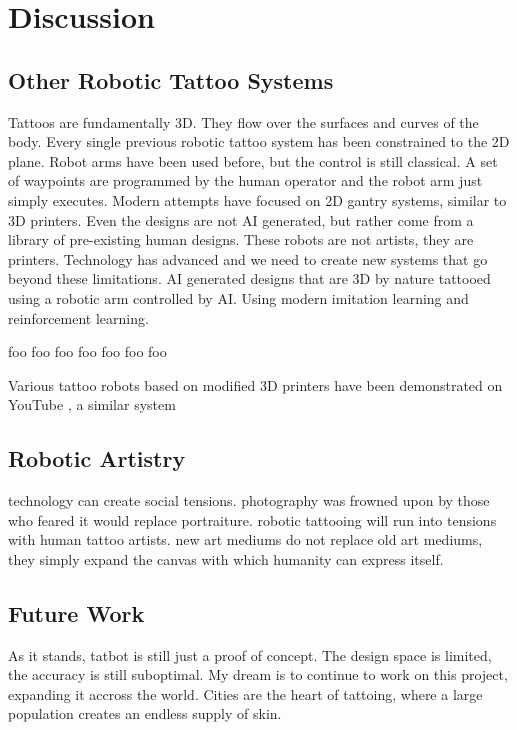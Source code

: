 \documentclass[11pt]{article}
\begin{document}
\section{Discussion}

\subsection{Other Robotic Tattoo Systems}

Tattoos are fundamentally 3D.
They flow over the surfaces and curves of the body.
Every single previous robotic tattoo system has been constrained to the 2D plane.
Robot arms have been used before, but the control is still classical.
A set of waypoints are programmed by the human operator and the robot arm just simply executes.
Modern attempts have focused on 2D gantry systems, similar to 3D printers.
Even the designs are not AI generated, but rather come from a library of pre-existing human designs.
These robots are not artists, they are printers.
Technology has advanced and we need to create new systems that go beyond these limitations.
AI generated designs that are 3D by nature tattooed using a robotic arm controlled by AI.
Using modern imitation learning and reinforcement learning.

foo \cite{NietoBastida2023}
foo \cite{arar2025swiftsketch}
foo \cite{carlier2020deepsvg}
foo \cite{mellor2020unsupervised}
foo \cite{ha2017neural}
foo \cite{huang2019learning}
foo \cite{kotani2019teaching}

Various tattoo robots based on modified 3D printers have been demonstrated on YouTube \cite{EmilyTheEngineer2025}, a similar system \cite{YamanDeif2021}

\subsection{Robotic Artistry}

technology can create social tensions.
photography was frowned upon by those who feared it would replace portraiture.
robotic tattooing will run into tensions with human tattoo artists.
new art mediums do not replace old art mediums, they simply expand the canvas with which humanity can express itself.

\subsection{Future Work}

As it stands, tatbot is still just a proof of concept.
The design space is limited, the accuracy is still suboptimal.
My dream is to continue to work on this project, expanding it accross the world.
Cities are the heart of tattoing, where a large population creates an endless supply of skin.
\end{document}
